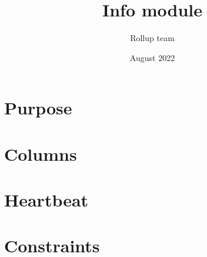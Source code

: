 \documentclass{article}
\title{Info module}
\author{Rollup team}
\date{August 2022}
\begin{document}
\maketitle
\tableofcontents

\section{Purpose}             
\section{Columns}             
\section{Heartbeat}           
\section{Constraints}         
\end{document}
